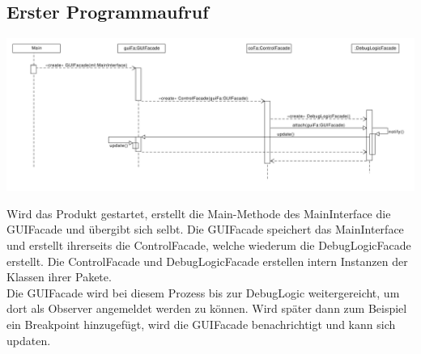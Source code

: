 \documentclass[parskip=full]{scrartcl}
\begin{document}
\subsection{Erster Programmaufruf}
\begin{center}
\includegraphics[width=1.0\textwidth]{diagrammIdeenUmlet/SequenceDiagrams/seq_firstCallPDF.pdf}
\end{center}
Wird das Produkt gestartet, erstellt die Main-Methode des MainInterface die GUIFacade und übergibt sich selbt.
Die GUIFacade speichert das MainInterface und erstellt ihrerseits die ControlFacade, welche wiederum
die DebugLogicFacade erstellt.
Die ControlFacade und DebugLogicFacade erstellen intern Instanzen der Klassen ihrer Pakete. \\
Die GUIFacade wird bei diesem Prozess bis zur DebugLogic weitergereicht, um dort als Observer angemeldet werden
zu können. Wird später dann zum Beispiel ein Breakpoint hinzugefügt, wird die GUIFacade benachrichtigt und
kann sich updaten.

\newpage
\end{document}
